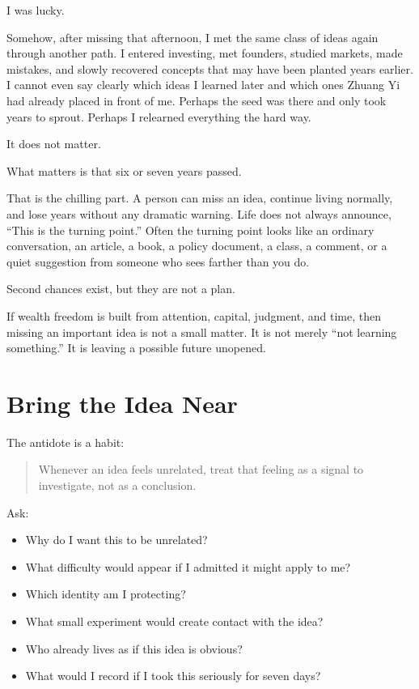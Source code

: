 I was lucky.

Somehow, after missing that afternoon, I met the same class of ideas again through another path. I entered investing, met founders, studied markets, made mistakes, and slowly recovered concepts that may have been planted years earlier. I cannot even say clearly which ideas I learned later and which ones Zhuang Yi had already placed in front of me. Perhaps the seed was there and only took years to sprout. Perhaps I relearned everything the hard way.

It does not matter.

What matters is that six or seven years passed.

That is the chilling part. A person can miss an idea, continue living normally, and lose years without any dramatic warning. Life does not always announce, ``This is the turning point.'' Often the turning point looks like an ordinary conversation, an article, a book, a policy document, a class, a comment, or a quiet suggestion from someone who sees farther than you do.

Second chances exist, but they are not a plan.

If wealth freedom is built from attention, capital, judgment, and time, then missing an important idea is not a small matter. It is not merely ``not learning something.'' It is leaving a possible future unopened.

\section*{Bring the Idea Near}

The antidote is a habit:

\begin{quote}
Whenever an idea feels unrelated, treat that feeling as a signal to investigate, not as a conclusion.
\end{quote}

Ask:

\begin{itemize}
\item Why do I want this to be unrelated?
\item What difficulty would appear if I admitted it might apply to me?
\item Which identity am I protecting?
\item What small experiment would create contact with the idea?
\item Who already lives as if this idea is obvious?
\item What would I record if I took this seriously for seven days?
\end{itemize}

